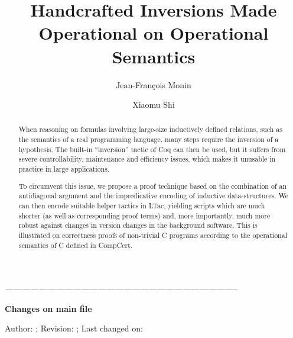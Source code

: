 \documentclass{llncs}
\newenvironment{thoughts}{%
  \color{darkgreen}
  \begin{trivlist}%
  \item}%
  {\end{trivlist}}
\begin{document}
\title{Handcrafted Inversions Made Operational on Operational Semantics
}
\author{Jean-Fran\c{c}ois Monin
\and 
Xiaomu Shi
}

\maketitle

\begin{abstract}
  When reasoning on formulas involving large-size inductively defined
  relations, such as the semantics of a real programming language,
  many steps require the inversion of a hypothesis. The built-in
  ``inversion'' tactic of Coq can then be used, but it suffers from
  severe controllability, maintenance and efficiency issues, which
  makes it unusable in practice in large applications.

  To circumvent this issue, we propose a proof technique based on the
  combination of an antidiagonal argument and the impredicative
  encoding of inductive data-structures. We can then encode suitable
  helper tactics in LTac, yielding scripts which are much shorter (as
  well as corresponding proof terms) and, more importantly, much more
  robust against changes in version changes in the background
  software. This is illustrated on correctness proofs of non-trivial C
  programs according to the operational semantics of C defined in
  CompCert.
\end{abstract}

\begin{thoughts}
\itshape
\hfil -----------------------------------------------------------------------------------\par
\hfil \textbf{Changes on main file}

Author: \svnfileauthor; Revision: \svnfilerev; Last changed on: \svnfiledate
\end{thoughts}











\end{document}
